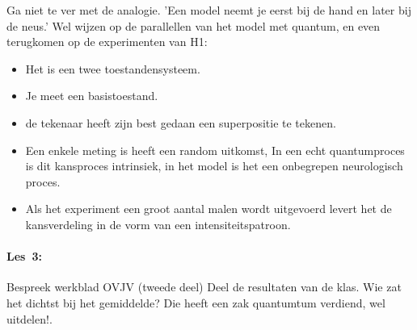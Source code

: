 \documentclass[../../main.tex]{subfiles}
\begin{document}
Ga niet te ver met de analogie. 'Een model neemt je eerst bij de hand en later bij de neus.' Wel wijzen op de parallellen van het model met quantum, en even terugkomen op de experimenten van H1:

\begin{itemize}
\item Het is een twee toestandensysteem.
\item Je meet een basistoestand.
\item de tekenaar heeft zijn best gedaan een superpositie te tekenen.
\item Een enkele meting is heeft een random uitkomst, In een echt quantumproces is dit kansproces intrinsiek, in het model is het een onbegrepen neurologisch proces.
\item Als het experiment een groot aantal malen wordt uitgevoerd levert het de kansverdeling in de vorm van een intensiteitspatroon.
\end{itemize}

\paragraph*{Les~3:} Bespreek werkblad OVJV (tweede deel)
Deel de resultaten van de klas. Wie zat het dichtst bij het gemiddelde? Die heeft een zak quantumtum verdiend, wel uitdelen!.
\end{document}
